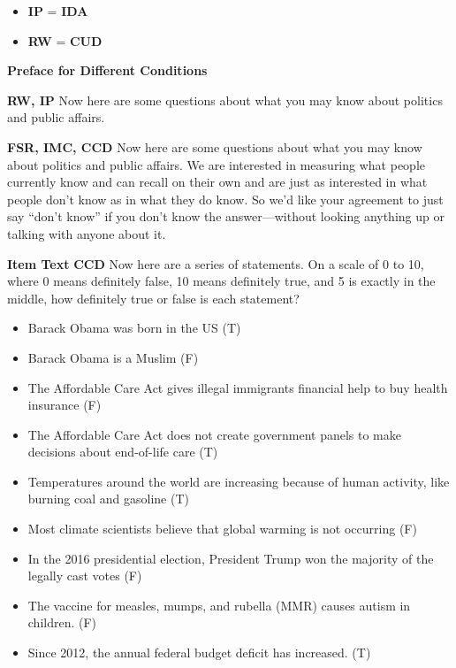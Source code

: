 \begin{itemize}
    \item{\textbf{IP} = \textbf{IDA}} 
    \item{\textbf{RW} = \textbf{CUD}} 
\end{itemize}

\noindent
\textbf{Preface for Different Conditions}

\textbf{RW, IP}\newline
Now here are some questions about what you may know about politics and public affairs.

\textbf{FSR, IMC, CCD}\newline
Now here are some questions about what you may know about politics and public affairs.
We are interested in measuring what people currently know and can recall on their own and are just as interested in what people don't know as in what they do know. So we'd like your agreement to just say ``don't know'' if you don't know the answer—without looking anything up or talking with anyone about it.

\textbf{Item Text}
\textbf{CCD}\newline
Now here are a series of statements. On a scale of 0 to 10, where 0 means definitely false, 10 means definitely true, and 5 is exactly in the middle, how definitely true or false is each statement?

\begin{itemize}
	\item Barack Obama was born in the US (T)
	\item  Barack Obama is a Muslim (F)
	\item  The Affordable Care Act gives illegal immigrants financial help to buy health insurance (F)
	\item  The Affordable Care Act does not create government panels to make decisions about end-of-life care (T)
	\item  Temperatures around the world are increasing because of human activity, like burning coal and gasoline (T)
	\item  Most climate scientists believe that global warming is not occurring (F)
	\item  In the 2016 presidential election, President Trump won the majority of the legally cast votes (F)
	\item  The vaccine for measles, mumps, and rubella (MMR) causes autism in children. (F)
	\item  Since 2012, the annual federal budget deficit has increased. (T)
\end{itemize}

